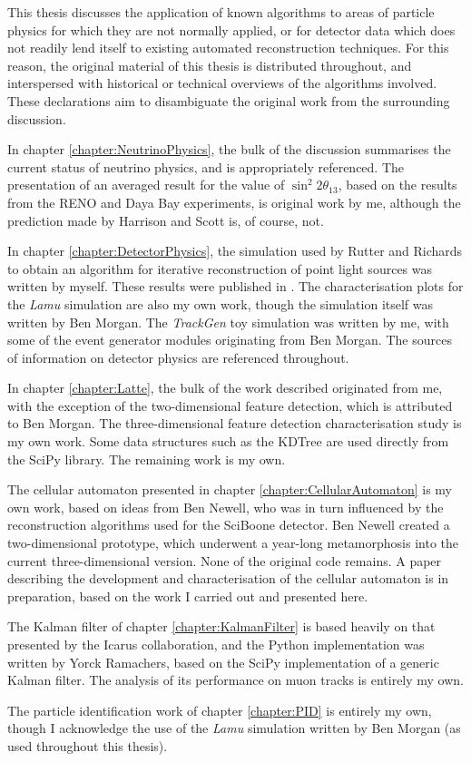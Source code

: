 This thesis discusses the application of known algorithms to areas of particle physics for which they are not normally applied, or for detector data which does not readily lend itself to existing automated reconstruction techniques. For this reason, the original material of this thesis is distributed throughout, and interspersed with historical or technical overviews of the algorithms involved. These declarations aim to disambiguate the original work from the surrounding discussion.

In chapter \ref{chapter:NeutrinoPhysics}, the bulk of the discussion summarises the current status of neutrino physics, and is appropriately referenced. The presentation of an averaged result for the value of $\sin^2 2\theta_{13}$, based on the results from the RENO and Daya Bay experiments, is original work by me, although the prediction made by Harrison and Scott is, of course, not.

In chapter \ref{chapter:DetectorPhysics}, the simulation used by Rutter and Richards to obtain an algorithm for iterative reconstruction of point light sources was written by myself. These results were published in \citep{Rutter2011}. The characterisation plots for the \emph{Lamu} simulation are also my own work, though the simulation itself was written by Ben Morgan. The \emph{TrackGen} toy simulation was written by me, with some of the event generator modules originating from Ben Morgan. The sources of information on detector physics are referenced throughout.

In chapter \ref{chapter:Latte}, the bulk of the work described originated from me, with the exception of the two-dimensional feature detection, which is attributed to Ben Morgan. The three-dimensional feature detection characterisation study is my own work. Some data structures such as the KDTree are used directly from the SciPy library. The remaining work is my own.

The cellular automaton presented in chapter \ref{chapter:CellularAutomaton} is my own work, based on ideas from Ben Newell, who was in turn influenced by the reconstruction algorithms used for the SciBoone detector. Ben Newell created a two-dimensional prototype, which underwent a year-long metamorphosis into the current three-dimensional version. None of the original code remains. A paper describing the development and characterisation of the cellular automaton is in preparation, based on the work I carried out and presented here.

The Kalman filter of chapter \ref{chapter:KalmanFilter} is based heavily on that presented by the Icarus collaboration, and the Python implementation was written by Yorck Ramachers, based on the SciPy implementation of a generic Kalman filter. The analysis of its performance on muon tracks is entirely my own.

The particle identification work of chapter \ref{chapter:PID} is entirely my own, though I acknowledge the use of the \emph{Lamu} simulation written by Ben Morgan (as used throughout this thesis).
